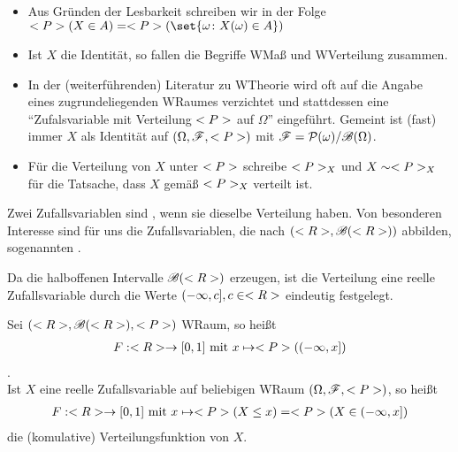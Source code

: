 \begin{*remark}
	\begin{itemize}
		\item Aus Gründen der Lesbarkeit schreiben wir in der Folge $\probp(X \in A) = \probp(\set{\omega \colon X(\omega) \in A})$
		\item Ist $X$ die Identität, so fallen die Begriffe WMaß und WVerteilung zusammen.
		\item In der (weiterführenden) Literatur zu WTheorie wird oft auf die Angabe eines zugrundeliegenden WRaumes verzichtet und stattdessen eine ``Zufalsvariable mit Verteilung $<P>$ auf $\Omega$'' eingeführt.
		Gemeint ist (fast) immer $X$ als Identität auf $(\Omega, \mathscr{F}, <P>)$ mit $\mathscr{F} = \mathcal{P}(\omega) / \mathscr{B}(\Omega)$.
		\item Für die Verteilung von $X$ unter $<P>$ schreibe $<P>_{X}$ und $X \sim <P>_{X}$ für die Tatsache, dass $X$ gemäß $<P>_{X}$ verteilt ist.
	\end{itemize}
\end{*remark}

\begin{definition}
	Zwei Zufallsvariablen sind , wenn sie dieselbe Verteilung haben.
	Von besonderen Interesse sind für uns die Zufallsvariablen, die nach $(<R>, \mathscr{B}(<R>))$ abbilden, sogenannten .
\end{definition}

Da die halboffenen Intervalle $\mathscr{B}(<R>)$ erzeugen, ist die Verteilung eine reelle Zufallsvariable durch die Werte $(-\infty, c], c \in <R>$ eindeutig festgelegt.

\begin{definition}
	Sei $(<R>, \mathscr{B}(<R>), <P>)$ WRaum, so heißt
	\begin{align}
		F: <R> \to [0,1] \text{ mit } x \mapsto <P>((-\infty, x]) \notag
	\end{align}
	.\\
	Ist $X$ eine reelle Zufallsvariable auf beliebigen WRaum $(\Omega, \mathscr{F}, <P>)$, so heißt
	\begin{align}
		F: <R> \to [0,1] \text{ mit } x \mapsto <P>(X \le x) = <P>(X \in (-\infty, x]) \notag
	\end{align} %
	die (komulative) Verteilungsfunktion von $X$.
\end{definition}

